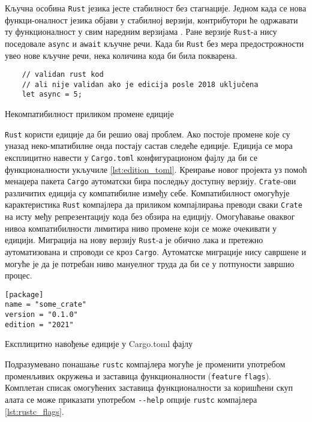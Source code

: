 Кључна особина \verb|Rust| језика јесте стабилност без стагнације. Једном када се нова 
функци\hyp{}оналност језика објави у стабилној верзији, контрибутори ће одржавати 
ту функционалност у свим наредним верзијама \cite{editions}.
Ране верзије \verb|Rust|-а нису поседовале \verb|async| и \verb|await| кључне речи.
Када би \verb|Rust| без мера предострожности увео нове кључне речи, нека количина кода би била покварена.

\begin{listing}[H]
\begin{verbatim}
    // validan rust kod 
    // ali nije validan ako je edicija posle 2018 uključena
    let async = 5; 
\end{verbatim}
\caption{Некомпатибилност приликом промене едиције}
\label{lst:edition}
\end{listing}


\verb|Rust| користи едиције да би решио овај проблем. Ако постоје промене које су уназад 
неко\hyp{}мпатибилне онда постају састав следеће едиције. Едиција се мора експлицитно навести 
у \verb|Cargo.toml| конфигурационом фајлу да би се функционалности укључиле \ref{lst:edition_toml}. Креирање новог пројекта уз 
помоћ менаџера пакета \verb|Cargo| аутоматски бира последњу доступну верзију.
\verb|Crate|-ови различитих едиција су компатибилне између себе. Компатибилност омогућује 
карактеристика \verb|Rust| компајлера да приликом компајлирања преводи сваки \verb|Crate| на исту међу репрезентацију 
кода без обзира на едицију. Омогућавање оваквог нивоа компатибилности лимитира ниво промене 
који се може очекивати у едицији. Миграција на нову верзију \verb|Rust|-а је обично лака и претежно аутоматизована
и спроводи се кроз \verb|Cargo|. Аутоматске миграције нису савршене и могуће је да је потребан ниво мануелног 
труда да би се у потпуности завршио процес.

\begin{listing}[H]
\begin{verbatim}
[package]
name = "some_crate"
version = "0.1.0"
edition = "2021"

\end{verbatim}
\caption{Експлицитно навођење едиције у Cargo.toml фајлу}
\label{lst:edition_toml}
\end{listing}

Подразумевано понашање \verb|rustc| компајлера могуће је променити употребом променљивих окружења 
и заставица функционалности (\verb|feature| \verb|flags|). Комплетан списак омогућених заставица функционалности 
за коришћени скуп алата се може приказати употребом \verb|--help| опције \verb|rustc| компајлера \ref{lst:rustc_flags}.

